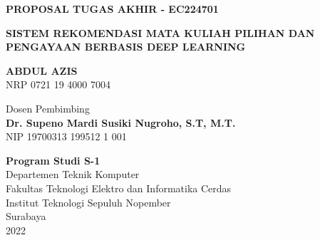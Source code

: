 {
\textbf{\large PROPOSAL TUGAS AKHIR - EC224701}

\vspace*{2cm}

\uppercase{\textbf{\Large Sistem rekomendasi Mata Kuliah Pilihan dan Pengayaan berbasis Deep Learning}}

\vspace*{2cm}

\uppercase{\textbf{\large Abdul Azis}} \\
\large NRP 0721 19 4000 7004

\vspace*{2cm}

\large Dosen Pembimbing \\
\textbf{\large Dr. Supeno Mardi Susiki Nugroho, S.T, M.T.} \\
\large NIP 19700313 199512 1 001

\vspace*{2cm}

\textbf{Program Studi S-1} \\
Departemen Teknik Komputer \\
Fakultas Teknologi Elektro dan Informatika Cerdas \\
Institut Teknologi Sepuluh Nopember \\

Surabaya \\
2022 \\
}
